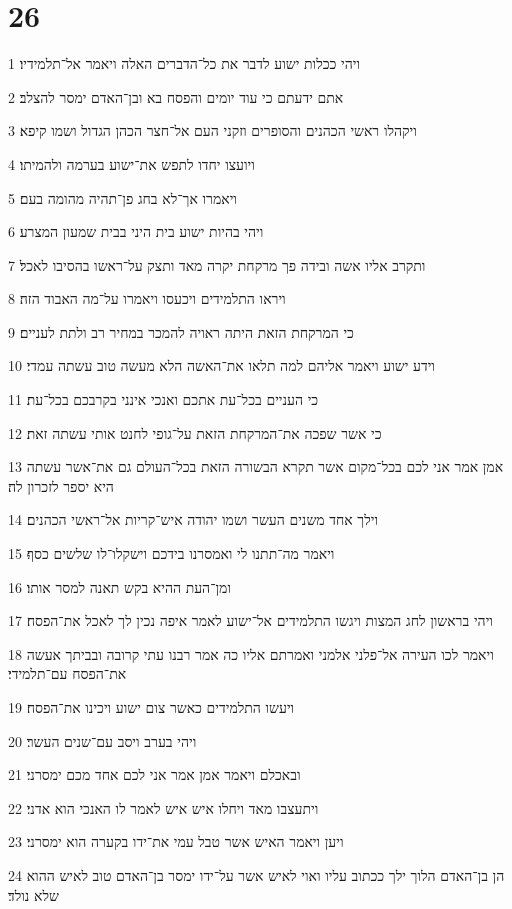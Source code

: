 \chapter{26}

\par 1 ויהי ככלות ישוע לדבר את כל־הדברים האלה ויאמר אל־תלמידיו׃
\par 2 אתם ידעתם כי עוד יומים והפסח בא ובן־האדם ימסר להצלב׃
\par 3 ויקהלו ראשי הכהנים והסופרים וזקני העם אל־חצר הכהן הגדול ושמו קיפא׃
\par 4 ויועצו יחדו לתפש את־ישוע בערמה ולהמיתו׃
\par 5 ויאמרו אך־לא בחג פן־תהיה מהומה בעם׃
\par 6 ויהי בהיות ישוע בית היני בבית שמעון המצרע׃
\par 7 ותקרב אליו אשה ובידה פך מרקחת יקרה מאד ותצק על־ראשו בהסיבו לאכל׃
\par 8 ויראו התלמידים ויכעסו ויאמרו על־מה האבוד הזה׃
\par 9 כי המרקחת הזאת היתה ראויה להמכר במחיר רב ולתת לעניים׃
\par 10 וידע ישוע ויאמר אליהם למה תלאו את־האשה הלא מעשה טוב עשתה עמדי׃
\par 11 כי העניים בכל־עת אתכם ואנכי אינני בקרבכם בכל־עת׃
\par 12 כי אשר שפכה את־המרקחת הזאת על־גופי לחנט אותי עשתה זאת׃
\par 13 אמן אמר אני לכם בכל־מקום אשר תקרא הבשורה הזאת בכל־העולם גם את־אשר עשתה היא יספר לזכרון לה׃
\par 14 וילך אחד משנים העשר ושמו יהודה איש־קריות אל־ראשי הכהנים׃
\par 15 ויאמר מה־תתנו לי ואמסרנו בידכם וישקלו־לו שלשים כסף׃
\par 16 ומן־העת ההיא בקש תאנה למסר אותו׃
\par 17 ויהי בראשון לחג המצות ויגשו התלמידים אל־ישוע לאמר איפה נכין לך לאכל את־הפסח׃
\par 18 ויאמר לכו העירה אל־פלני אלמני ואמרתם אליו כה אמר רבנו עתי קרובה ובביתך אעשה את־הפסח עם־תלמידי׃
\par 19 ויעשו התלמידים כאשר צום ישוע ויכינו את־הפסח׃
\par 20 ויהי בערב ויסב עם־שנים העשר׃
\par 21 ובאכלם ויאמר אמן אמר אני לכם אחד מכם ימסרני׃
\par 22 ויתעצבו מאד ויחלו איש איש לאמר לו האנכי הוא אדני׃
\par 23 ויען ויאמר האיש אשר טבל עמי את־ידו בקערה הוא ימסרני׃
\par 24 הן בן־האדם הלוך ילך ככתוב עליו ואוי לאיש אשר על־ידו ימסר בן־האדם טוב לאיש ההוא שלא נולד׃
